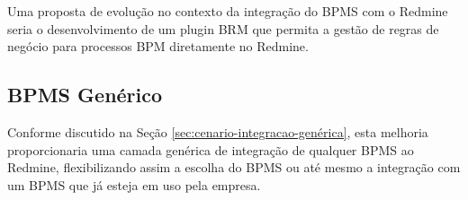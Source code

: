 Uma proposta de evolução no contexto da integração do BPMS com o Redmine seria o desenvolvimento de um plugin BRM que permita a gestão de regras de negócio para processos BPM diretamente no Redmine.

\subsection{BPMS Genérico}

Conforme discutido na Seção \ref{sec:cenario-integracao-genérica}, esta melhoria proporcionaria uma camada genérica de integração de qualquer BPMS ao Redmine, flexibilizando assim a escolha do BPMS ou até mesmo a integração com um BPMS que já esteja em uso pela empresa. 